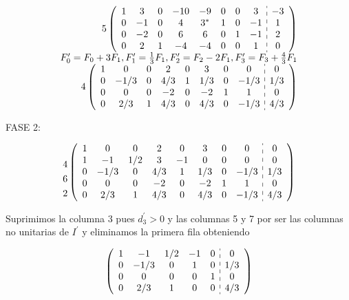 \documentclass[10pt]{article}
\begin{document}
$$
\begin{array}{r}
5\left(\begin{array}{cccccccc:c}
1 & 3 & 0 & -10 & -9 & 0 & 0 & 3 & -3 \\
0 & -1 & 0 & 4 & 3^{*} & 1 & 0 & -1 & 1 \\
0 & -2 & 0 & 6 & 6 & 0 & 1 & -1 & 2 \\
0 & 2 & 1 & -4 & -4 & 0 & 0 & 1 & 0
\end{array}\right) \\
F_{0}^{\prime}=F_{0}+3 F_{1}, F_{1}^{\prime}=\frac{1}{3} F_{1}, F_{2}^{\prime}=F_{2}-2 F_{1}, F_{3}^{\prime}=F_{3}+\frac{4}{3} F_{1} \\
4\left(\begin{array}{cccccccc:c}
1 & 0 & 0 & 2 & 0 & 3 & 0 & 0 & 0 \\
0 & -1 / 3 & 0 & 4 / 3 & 1 & 1 / 3 & 0 & -1 / 3 & 1 / 3 \\
0 & 0 & 0 & -2 & 0 & -2 & 1 & 1 & 0 \\
0 & 2 / 3 & 1 & 4 / 3 & 0 & 4 / 3 & 0 & -1 / 3 & 4 / 3
\end{array}\right)
\end{array}
$$

FASE 2:

$$
\begin{gathered}
\\
4 \\
6 \\
2
\end{gathered}\left(\begin{array}{cccccccc:c}
1 & 0 & 0 & 2 & 0 & 3 & 0 & 0 & 0 \\
1 & -1 & 1 / 2 & 3 & -1 & 0 & 0 & 0 & 0 \\
0 & -1 / 3 & 0 & 4 / 3 & 1 & 1 / 3 & 0 & -1 / 3 & 1 / 3 \\
0 & 0 & 0 & -2 & 0 & -2 & 1 & 1 & 0 \\
0 & 2 / 3 & 1 & 4 / 3 & 0 & 4 / 3 & 0 & -1 / 3 & 4 / 3
\end{array}\right)
$$

Suprimimos la columna 3 pues $d_{3}^{\prime}>0$ y las columnas 5 y 7 por ser las columnas no unitarias de $I^{\prime}$ y eliminamos la primera fila obteniendo

$$
\left(\begin{array}{ccccc:c}
1 & -1 & 1 / 2 & -1 & 0 & 0 \\
0 & -1 / 3 & 0 & 1 & 0 & 1 / 3 \\
0 & 0 & 0 & 0 & 1 & 0 \\
0 & 2 / 3 & 1 & 0 & 0 & 4 / 3
\end{array}\right)
$$
\end{document}
